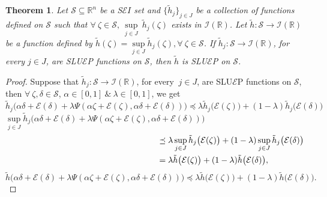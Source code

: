 \documentclass[12pt, reqno]{amsart}
\newtheorem{theorem}{Theorem}[section]
\theoremstyle{definition}
\theoremstyle{remark}
\numberwithin{equation}{section}
\begin{document}
    \begin{theorem} 
    	Let ${\mathcal{S}}\subseteq  \mathbb{R}^{n}$ be a S$\mathcal{E}I$ set and $\{ \tilde{h}_j\}_{j\in J}$ be a collection of  functions defined on $ {\mathcal{S}}$ such that $\forall~ \mathit{\zeta} \in {\mathcal{S}},~\sup\limits_{j\in J} ~ \tilde{h}_j(\mathit{\zeta} )$ exists in $\mathcal{I}(\mathbb{R})$. Let $ \tilde{h}: {\mathcal{S}}\rightarrow  \mathcal{I}(\mathbb{R})$ be a function defined by $ \tilde{h}(\mathit{\zeta} )=\sup\limits_{j\in J} \tilde{h}_j(\mathit{\zeta} ),\forall~ \mathit{\zeta} \in  {\mathcal{S}}$. If $ \tilde{h}_j: {\mathcal{S}}\rightarrow  \mathcal{I}(\mathbb{R})$, for every $j\in J$, are  SLU$\mathcal{E}$P functions on $ {\mathcal{S}}$, then  $ \tilde{h}$ is  SLU$\mathcal{E}$P on $ {\mathcal{S}}$.   
    \end{theorem}
    \begin{proof}
    	Suppose that $ \tilde{h}_j: {\mathcal{S}}\rightarrow  \mathcal{I}(\mathbb{R})$, for every $ ~j\in J$, are SLU$\mathcal{E}$P functions on $ {\mathcal{S}}$, then $\forall~\mathit{\zeta} ,\mathit{\delta} \in {\mathcal{S}}$, ${\alpha} \in {[0,1]}~\&~ {\lambda} \in {[0,1]} $, we get\\
    	
    	$\tilde{h}_j\big( {\alpha}  \mathit{\delta} + {\mathcal{E}}( \mathit{\delta} )+ {\lambda} {\Psi}( {\alpha}  \mathit{\zeta} + {\mathcal{E}}( \mathit{\zeta} ), {\alpha}  \mathit{\delta} + {\mathcal{E}}( \mathit{\delta} ))\big)\preceq{\lambda}  \tilde{h}_j\big( {\mathcal{E}}( \mathit{\zeta} )\big)+(1- {\lambda}) \tilde{h}_j\big( {\mathcal{E}}( \mathit{\delta} )\big)$\\
    	
    	$\sup\limits_{j\in J} \tilde{h}_j\big( {\alpha}  \mathit{\delta} + {\mathcal{E}}( \mathit{\delta} )+ {\lambda} {\Psi}( {\alpha}  \mathit{\zeta} + {\mathcal{E}}( \mathit{\zeta} ), {\alpha}  \mathit{\delta} + {\mathcal{E}}( \mathit{\delta} ))\big)$
     \begin{equation*}
         \begin{aligned}
              \hspace{6.2cm}&\preceq{\lambda}\sup\limits_{j\in J}\tilde{h}_j\big({\mathcal{E}}(\mathit{\zeta} )\big)+(1- {\lambda})\sup\limits_{j\in J}\tilde{h}_j\big( {\mathcal{E}} (\mathit{\delta} )\big)\\
     	&= {\lambda}\tilde{h}\big({\mathcal{E}}(\mathit{\zeta} )\big)+(1-{\lambda})\tilde{h}\big({\mathcal{E}} (\mathit{\delta} )\big),\\
         \end{aligned}
     \end{equation*}
     $$\tilde{h}\big({\alpha}\mathit{\delta} + {\mathcal{E}} (\mathit{\delta} )+{\lambda} {\Psi}({\alpha}\mathit{\zeta} + {\mathcal{E}}(\mathit{\zeta} ), {\alpha}\mathit{\delta} +{\mathcal{E}} (\mathit{\delta} ))\big)
     \preceq{\lambda}\tilde{h}\big({\mathcal{E}}(\mathit{\zeta} )\big)+(1-{\lambda})\tilde{h}\big({\mathcal{E}} (\mathit{\delta} )\big).$$
    \end{proof}    
\end{document}
